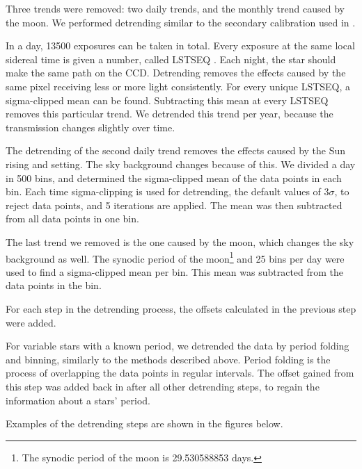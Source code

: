 \documentclass[onecolumn]{aa} %
\begin{document}
Three trends were removed: two daily trends, and the monthly trend caused by the moon. We performed detrending similar to the secondary calibration used in \cite{Talens_2018}.

In a day, 13500 exposures can be taken in total. Every exposure at the same local sidereal time is given a number, called LSTSEQ \citep{Talens_2018}. Each night, the star should make the same path on the CCD. Detrending removes the effects caused by the same pixel receiving less or more light consistently. For every unique LSTSEQ, a sigma-clipped mean can be found. Subtracting this mean at every LSTSEQ removes this particular trend. We detrended this trend per year, because the transmission changes slightly over time.


The detrending of the second daily trend removes the effects caused by the Sun rising and setting. The sky background changes because of this. We divided a day in 500 bins, and determined the sigma-clipped mean of the data points in each bin. Each time sigma-clipping is used for detrending, the default values of 3$\sigma$, to reject data points, and 5 iterations are applied. The mean was then subtracted from all data points in one bin.

The last trend we removed is the one caused by the moon, which changes the sky background as well. The synodic period of the moon\footnote{The synodic period of the moon is 29.530588853 days.} and 25 bins per day were used to find a sigma-clipped mean per bin. This mean was subtracted from the data points in the bin. 

For each step in the detrending process, the offsets calculated in the previous step were added.

For variable stars with a known period, we detrended the data by period folding and binning, similarly to the methods described above. Period folding is the process of overlapping the data points in regular intervals. The offset gained from this step was added back in after all other detrending steps, to regain the information about a stars' period.

Examples of the detrending steps are shown in the figures below.
\end{document}
